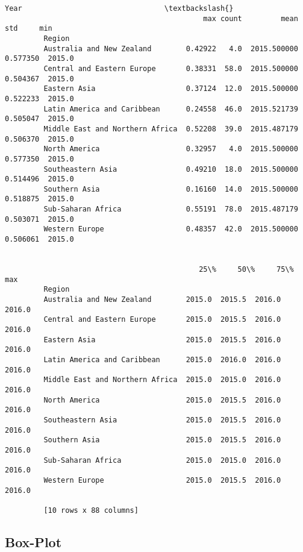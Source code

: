 \documentclass[11pt]{article}
\begin{document}
\begin{Verbatim}[commandchars=\\\{\}]
                                                   Year                                 \textbackslash{}
                                              max count         mean       std     min   
         Region                                                                          
         Australia and New Zealand        0.42922   4.0  2015.500000  0.577350  2015.0   
         Central and Eastern Europe       0.38331  58.0  2015.500000  0.504367  2015.0   
         Eastern Asia                     0.37124  12.0  2015.500000  0.522233  2015.0   
         Latin America and Caribbean      0.24558  46.0  2015.521739  0.505047  2015.0   
         Middle East and Northern Africa  0.52208  39.0  2015.487179  0.506370  2015.0   
         North America                    0.32957   4.0  2015.500000  0.577350  2015.0   
         Southeastern Asia                0.49210  18.0  2015.500000  0.514496  2015.0   
         Southern Asia                    0.16160  14.0  2015.500000  0.518875  2015.0   
         Sub-Saharan Africa               0.55191  78.0  2015.487179  0.503071  2015.0   
         Western Europe                   0.48357  42.0  2015.500000  0.506061  2015.0   
         
                                                                          
                                             25\%     50\%     75\%     max  
         Region                                                           
         Australia and New Zealand        2015.0  2015.5  2016.0  2016.0  
         Central and Eastern Europe       2015.0  2015.5  2016.0  2016.0  
         Eastern Asia                     2015.0  2015.5  2016.0  2016.0  
         Latin America and Caribbean      2015.0  2016.0  2016.0  2016.0  
         Middle East and Northern Africa  2015.0  2015.0  2016.0  2016.0  
         North America                    2015.0  2015.5  2016.0  2016.0  
         Southeastern Asia                2015.0  2015.5  2016.0  2016.0  
         Southern Asia                    2015.0  2015.5  2016.0  2016.0  
         Sub-Saharan Africa               2015.0  2015.0  2016.0  2016.0  
         Western Europe                   2015.0  2015.5  2016.0  2016.0  
         
         [10 rows x 88 columns]
\end{Verbatim}
            
    \subsection{Box-Plot}\label{box-plot}
\end{document}
